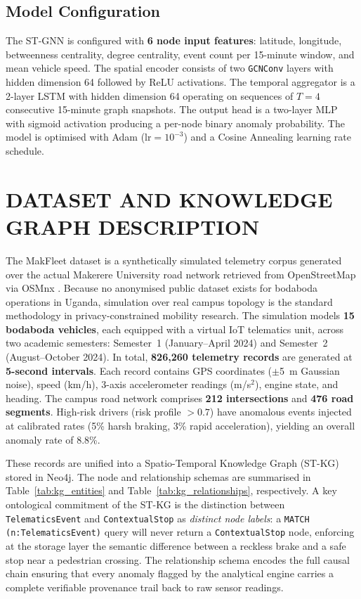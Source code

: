 \documentclass{ieeeaccess}
\begin{document}
\subsection{Model Configuration}
The ST-GNN is configured with \textbf{6 node input features}: latitude,
longitude, betweenness centrality, degree centrality, event count per
15-minute window, and mean vehicle speed. The spatial encoder consists
of two \texttt{GCNConv} layers with hidden dimension 64 followed by
ReLU activations. The temporal aggregator is a 2-layer LSTM with hidden
dimension 64 operating on sequences of $T=4$ consecutive 15-minute
graph snapshots. The output head is a two-layer MLP with sigmoid
activation producing a per-node binary anomaly probability. The model
is optimised with Adam ($\text{lr}=10^{-3}$) and a Cosine Annealing
learning rate schedule.


\section{DATASET AND KNOWLEDGE GRAPH DESCRIPTION}
\label{sec:dataset}

The MakFleet dataset is a synthetically simulated telemetry corpus
generated over the actual Makerere University road network retrieved
from OpenStreetMap via OSMnx \cite{boeing2017}. Because no anonymised
public dataset exists for bodaboda operations in Uganda, simulation
over real campus topology is the standard methodology in
privacy-constrained mobility research. The simulation models
\textbf{15 bodaboda vehicles}, each equipped with a virtual IoT
telematics unit, across two academic semesters: Semester~1
(January--April 2024) and Semester~2 (August--October 2024). In total,
\textbf{826,260 telemetry records} are generated at \textbf{5-second
intervals}. Each record contains GPS coordinates ($\pm$5~m Gaussian
noise), speed (km/h), 3-axis accelerometer readings (m/s$^2$), engine
state, and heading. The campus road network comprises \textbf{212
intersections} and \textbf{476 road segments}. High-risk drivers
(risk profile $>0.7$) have anomalous events injected at calibrated
rates (5\% harsh braking, 3\% rapid acceleration), yielding an overall
anomaly rate of 8.8\%.

These records are unified into a Spatio-Temporal Knowledge Graph (ST-KG)
stored in Neo4j. The node and relationship schemas are summarised in
Table~\ref{tab:kg_entities} and Table~\ref{tab:kg_relationships},
respectively. A key ontological commitment of the ST-KG is the
distinction between \texttt{TelematicsEvent} and
\texttt{ContextualStop} as \emph{distinct node labels}: a
\texttt{MATCH (n:TelematicsEvent)} query will never return a
\texttt{ContextualStop} node, enforcing at the storage layer the
semantic difference between a reckless brake and a safe stop near a
pedestrian crossing. The relationship schema encodes the full causal
chain ensuring that every anomaly flagged by the analytical engine
carries a complete verifiable provenance trail back to raw sensor
readings.
\end{document}
